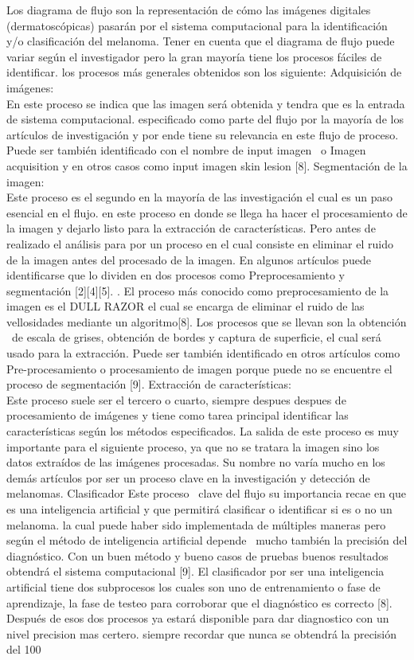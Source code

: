 \documentclass[a4paper]{article}
\begin{document}
Los diagrama de flujo son la representación de cómo las imágenes digitales (dermatoscópicas) pasarán por el sistema computacional para la identificación y/o clasificación del melanoma. Tener en cuenta que el diagrama de flujo puede variar según el investigador pero la gran mayoría tiene los procesos fáciles de identificar. 
los procesos más generales obtenidos son los siguiente:
Adquisición de imágenes:\\ 
En este proceso se indica que las imagen será obtenida y tendra que es la entrada de sistema computacional. especificado como parte del flujo por la mayoría de los artículos de investigación y por ende tiene su relevancia en este flujo de proceso.
Puede ser también identificado con el nombre de input imagen  o Imagen acquisition y en otros casos como input imagen skin lesion [8].
Segmentación de la imagen:\\ 
Este proceso es el segundo en la mayoría de las investigación el cual es un paso esencial en el flujo. en este proceso en donde se llega ha hacer el procesamiento de la imagen y dejarlo listo para la extracción de características. 
Pero antes de realizado el análisis para por un proceso en el cual consiste en eliminar el ruido de la imagen antes del procesado de la imagen. En algunos artículos puede identificarse que lo dividen en dos procesos como Preprocesamiento y segmentación [2][4][5]. .
El proceso más conocido como preprocesamiento de la imagen es el DULL RAZOR el cual se encarga de eliminar el ruido de las vellosidades mediante un algoritmo[8].
Los procesos que se llevan son la obtención  de escala de grises, obtención de bordes y captura de superficie, el cual será usado para la extracción.
Puede ser también identificado en otros artículos como Pre-procesamiento o procesamiento de imagen porque puede no se encuentre el proceso de segmentación [9].
Extracción de características:\\
Este proceso suele ser el tercero o cuarto, siempre despues despues de procesamiento de imágenes y tiene como tarea principal identificar las características según los métodos especificados.
La salida de este proceso es muy importante para el siguiente proceso, ya que no se tratara la imagen sino los datos extraídos de las imágenes procesadas.
Su nombre no varía mucho en los demás artículos por ser un proceso clave en la investigación y detección de melanomas.
Clasificador
Este proceso  clave del flujo su importancia recae en que es una inteligencia artificial y que permitirá clasificar o identificar si es o no un melanoma. la cual puede haber sido implementada de múltiples maneras pero según el método de inteligencia artificial depende  mucho también la precisión del diagnóstico. Con un buen método y bueno casos de pruebas buenos resultados obtendrá el sistema computacional [9].
El clasificador por ser una inteligencia artificial tiene dos subprocesos los cuales son uno de entrenamiento o fase de aprendizaje, la fase de testeo para corroborar que el diagnóstico es correcto [8].
Después de esos dos procesos ya estará disponible para dar diagnostico con un nivel precision mas certero. siempre recordar que nunca se obtendrá la precisión del 100%
\end{document}
